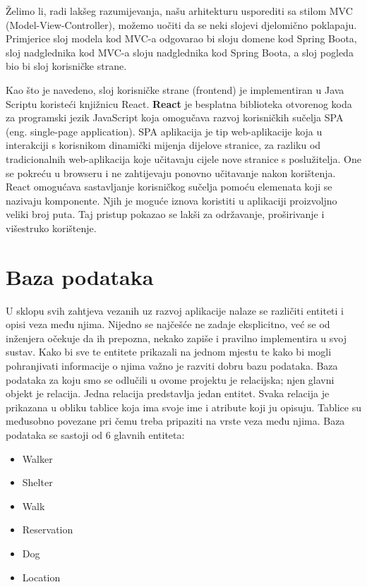 Želimo li, radi lakšeg razumijevanja, našu arhitekturu usporediti sa stilom MVC (Model-View-Controller), možemo uočiti da se neki slojevi djelomično poklapaju. Primjerice sloj modela kod MVC-a
odgovarao bi sloju domene kod Spring Boota, sloj nadglednika kod MVC-a sloju
nadglednika kod Spring Boota, a sloj pogleda bio bi sloj korisničke strane. 


\vspace{15pt}
Kao što je navedeno, sloj korisničke strane (frontend) je implementiran u Java Scriptu koristeći knjižnicu React. \textbf{React} je besplatna biblioteka otvorenog koda za programski jezik JavaScript koja omogučava razvoj korisničkih sučelja SPA (eng. single-page application). SPA aplikacija je
tip web-aplikacije koja u interakciji s korisnikom dinamički mijenja dijelove stranice, za razliku od tradicionalnih web-aplikacija koje učitavaju cijele nove stranice s poslužitelja. One se pokreću u browseru i ne zahtijevaju ponovno učitavanje nakon korištenja.
React omogućava sastavljanje korisničkog sučelja pomoću elemenata koji se nazivaju komponente. Njih je moguće iznova koristiti u aplikaciji proizvoljno veliki broj puta. Taj pristup pokazao se lakši za održavanje, proširivanje i višestruko korištenje.

\newpage



	
		

		

				
		\section{Baza podataka}
			
			U sklopu svih zahtjeva vezanih uz razvoj aplikacije nalaze se različiti entiteti i opisi veza među njima. Nijedno se najčešće ne zadaje eksplicitno, već se od inženjera očekuje da ih prepozna, nekako zapiše i pravilno implementira u svoj sustav. Kako bi sve te entitete prikazali na jednom mjestu te kako bi mogli pohranjivati informacije o njima važno je razviti dobru bazu podataka. Baza podataka za koju smo se odlučili u ovome projektu je relacijska; njen glavni objekt je relacija. Jedna relacija predstavlja jedan entitet. Svaka relacija je prikazana u obliku tablice koja ima svoje ime i atribute koji ju opisuju. Tablice su međusobno povezane pri čemu treba pripaziti na vrste veza među njima.  
			Baza podataka se sastoji od 6 glavnih entiteta:
			
			\begin{itemize}
				\item Walker 
				\item Shelter
				\item Walk
				\item Reservation
				\item Dog
				\item Location 
			\end{itemize}
		
